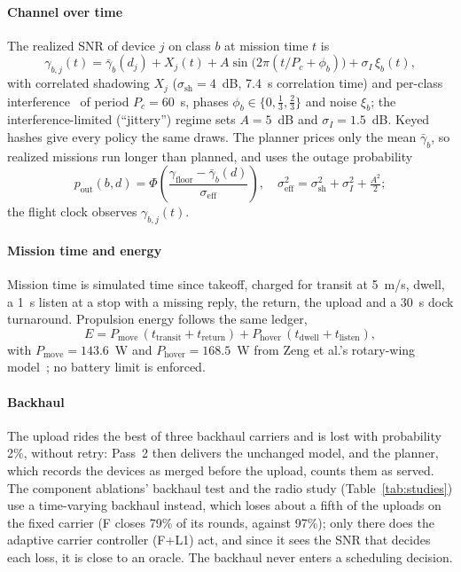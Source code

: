 \documentclass[conference]{IEEEtran}
\begin{document}
\paragraph{Channel over time}
The realized SNR of device $j$ on class $b$ at mission time $t$ is
\begin{equation}
\gamma_{b,j}(t)=\bar\gamma_b(d_j)+X_j(t)+A\sin\bigl(2\pi(t/P_c+\phi_b)\bigr)+\sigma_I\,\xi_b(t),
\label{eq:realsnr}
\end{equation}
with correlated shadowing $X_j$ ($\sigma_{\mathrm{sh}}=4$~dB, 7.4~s correlation
time) and per-class interference~\cite{3gpp36777} of period $P_c=60$~s, phases
$\phi_b\in\{0,\tfrac13,\tfrac23\}$ and noise $\xi_b$; the interference-limited
(``jittery'') regime sets $A=5$~dB and $\sigma_I=1.5$~dB. Keyed hashes give every
policy the same draws. The planner prices only the mean $\bar\gamma_b$, so
realized missions run longer than planned, and uses the outage probability
\begin{equation}
p_{\mathrm{out}}(b,d)=\Phi\!\left(\frac{\gamma_{\mathrm{floor}}-\bar\gamma_b(d)}{\sigma_{\mathrm{eff}}}\right),
\quad
\sigma_{\mathrm{eff}}^2=\sigma_{\mathrm{sh}}^2+\sigma_I^2+\tfrac{A^2}{2};
\label{eq:pout}
\end{equation}
the flight clock observes $\gamma_{b,j}(t)$.

\paragraph{Mission time and energy}
Mission time is simulated time since takeoff, charged for transit at 5~m/s,
dwell, a 1~s listen at a stop with a missing reply, the return, the upload and a
30~s dock turnaround. Propulsion energy follows the same ledger,
\begin{equation}
E = P_{\mathrm{move}}\,(t_{\mathrm{transit}}+t_{\mathrm{return}})
  + P_{\mathrm{hover}}\,(t_{\mathrm{dwell}}+t_{\mathrm{listen}}),
\label{eq:energy}
\end{equation}
with $P_{\mathrm{move}}=143.6$~W and $P_{\mathrm{hover}}=168.5$~W from Zeng et
al.'s rotary-wing model~\cite{zeng2019energy}; no battery limit is enforced.

\paragraph{Backhaul}
The upload rides the best of three backhaul carriers and is lost with probability
2\%, without retry: Pass~2 then delivers the unchanged model, and the planner,
which records the devices as merged before the upload, counts them as served.
The component ablations' backhaul test and the radio study
(Table~\ref{tab:studies}) use a time-varying backhaul instead, which loses about
a fifth of the uploads on the fixed carrier (F closes 79\% of its rounds,
against 97\%); only there does the adaptive carrier controller (F+L1) act, and
since it sees the SNR that decides each loss, it is close to an oracle. The
backhaul never enters a scheduling decision.
\end{document}
